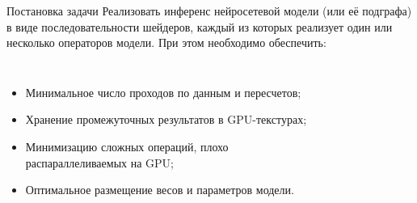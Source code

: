 \documentclass[aspectratio=169,xcolor=dvipsnames]{beamer}
\begin{document}
\begin{frame}{Постановка задачи}
    Реализовать инференс нейросетевой модели (или её подграфа) в виде последовательности шейдеров, каждый из которых реализует один или несколько операторов модели. При этом необходимо обеспечить:
    \begin{columns}[c] %

        \begin{itemize}
            \item Минимальное число проходов по данным и пересчетов;
            \item Хранение промежуточных результатов в GPU-текстурах;
            \item Минимизацию сложных операций, плохо распараллеливаемых на GPU;
            \item Оптимальное размещение весов и параметров модели.
        \end{itemize}

        \begin{figure}[h]
            \label{ris:bottleneck}
        \end{figure}
        
    \end{columns}
\end{frame}

\end{document}
